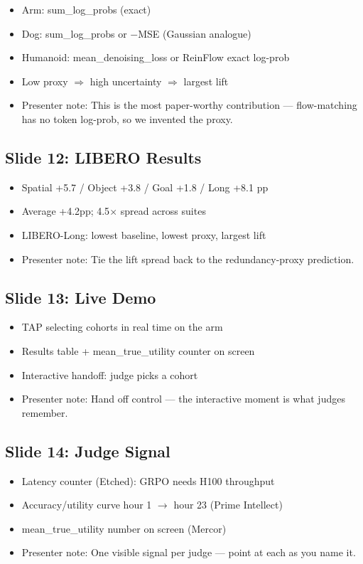 \documentclass[11pt,letterpaper]{article}
\begin{document}
\begin{itemize}
\item Arm: sum\_log\_probs (exact)
\item Dog: sum\_log\_probs or $-$MSE (Gaussian analogue)
\item Humanoid: mean\_denoising\_loss or ReinFlow exact log-prob
\item Low proxy $\Rightarrow$ high uncertainty $\Rightarrow$ largest lift
\item Presenter note: This is the most paper-worthy contribution --- flow-matching has no token log-prob, so we invented the proxy.
\end{itemize}

\subsection*{Slide 12: LIBERO Results}

\begin{itemize}
\item Spatial +5.7 / Object +3.8 / Goal +1.8 / Long +8.1 pp
\item Average +4.2pp; 4.5$\times$ spread across suites
\item LIBERO-Long: lowest baseline, lowest proxy, largest lift
\item Presenter note: Tie the lift spread back to the redundancy-proxy prediction.
\end{itemize}

\subsection*{Slide 13: Live Demo}

\begin{itemize}
\item TAP selecting cohorts in real time on the arm
\item Results table + mean\_true\_utility counter on screen
\item Interactive handoff: judge picks a cohort
\item Presenter note: Hand off control --- the interactive moment is what judges remember.
\end{itemize}

\subsection*{Slide 14: Judge Signal}

\begin{itemize}
\item Latency counter (Etched): GRPO needs H100 throughput
\item Accuracy/utility curve hour 1 $\rightarrow$ hour 23 (Prime Intellect)
\item mean\_true\_utility number on screen (Mercor)
\item Presenter note: One visible signal per judge --- point at each as you name it.
\end{itemize}
\end{document}
